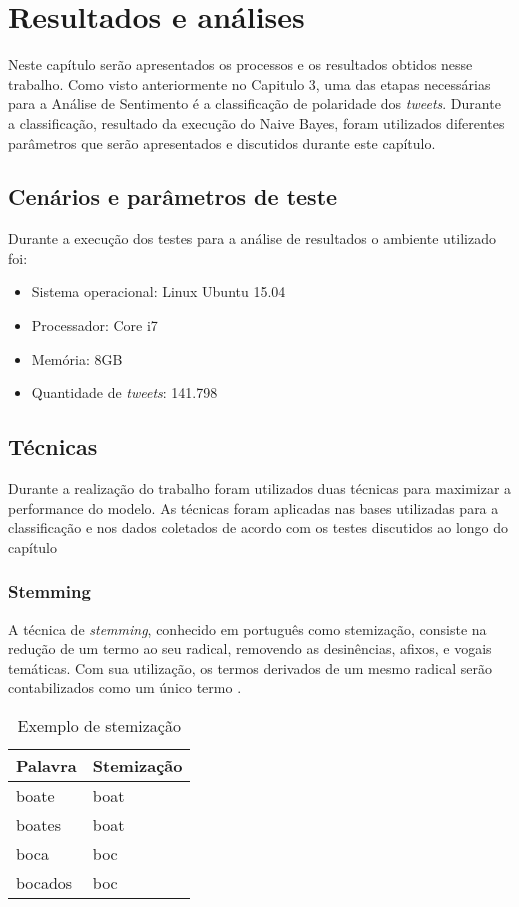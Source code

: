 \chapter{Resultados e análises}\label{cap:resultados}

Neste capítulo serão apresentados os processos e os resultados obtidos nesse trabalho. Como visto anteriormente no Capitulo 3,  uma das etapas
necessárias para a Análise de Sentimento é a classificação de polaridade dos \textit{tweets}. Durante a classificação, resultado da execução do Naive Bayes, foram utilizados diferentes parâmetros que serão apresentados e discutidos durante este capítulo.

\section{Cenários e parâmetros de teste}\label{sec:cenarios}
Durante a execução dos testes para a análise de resultados o ambiente utilizado foi:
\begin{itemize}
	\item Sistema operacional: Linux Ubuntu 15.04
	\item Processador: Core i7
	\item Memória: 8GB
	\item Quantidade de \textit{tweets}: 141.798
\end{itemize}

\section{Técnicas}
Durante a realização do trabalho foram utilizados duas técnicas para maximizar a performance do modelo. As técnicas foram aplicadas nas bases utilizadas para a classificação e nos dados coletados de acordo com os testes discutidos ao longo do capítulo
\subsection{Stemming}
A técnica de \textit{stemming}, conhecido em português como stemização, consiste na redução de um termo ao seu radical, removendo as desinências, afixos, e vogais temáticas. Com sua utilização, os termos derivados de um mesmo radical serão contabilizados como um único termo \cite{989755}.
\begin{table}[]
	\centering
	\caption{Exemplo de stemização}
	\label{my-label}
	\begin{tabular}{|l|l|}
		\hline
		\multicolumn{1}{|c|}{Palavra} & \multicolumn{1}{c|}{Stemização} \\ \hline
		boate                         & boat                            \\ \hline
		boates                        & boat                            \\ \hline
		boca                          & boc                             \\ \hline
		bocados                       & boc                             \\ \hline
	\end{tabular}
\end{table}

